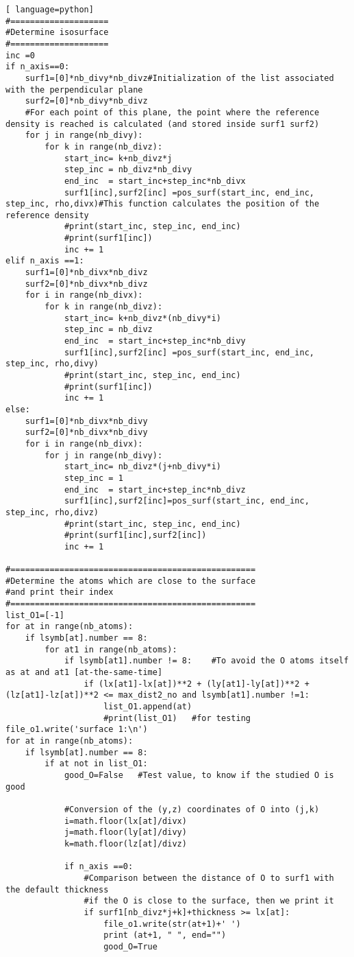 \begin{lstlisting}[ language=python]
#====================
#Determine isosurface
#====================
inc =0
if n_axis==0:
	surf1=[0]*nb_divy*nb_divz#Initialization of the list associated with the perpendicular plane
	surf2=[0]*nb_divy*nb_divz
	#For each point of this plane, the point where the reference density is reached is calculated (and stored inside surf1 surf2)
	for j in range(nb_divy):
		for k in range(nb_divz):
			start_inc= k+nb_divz*j
			step_inc = nb_divz*nb_divy
			end_inc  = start_inc+step_inc*nb_divx
			surf1[inc],surf2[inc] =pos_surf(start_inc, end_inc, step_inc, rho,divx)#This function calculates the position of the reference density
			#print(start_inc, step_inc, end_inc)
			#print(surf1[inc])
			inc += 1
elif n_axis ==1:
	surf1=[0]*nb_divx*nb_divz
	surf2=[0]*nb_divx*nb_divz
	for i in range(nb_divx):
		for k in range(nb_divz):
			start_inc= k+nb_divz*(nb_divy*i)
			step_inc = nb_divz
			end_inc  = start_inc+step_inc*nb_divy
			surf1[inc],surf2[inc] =pos_surf(start_inc, end_inc, step_inc, rho,divy)
			#print(start_inc, step_inc, end_inc)
			#print(surf1[inc])
			inc += 1
else:
	surf1=[0]*nb_divx*nb_divy
	surf2=[0]*nb_divx*nb_divy
	for i in range(nb_divx):
		for j in range(nb_divy):
			start_inc= nb_divz*(j+nb_divy*i)
			step_inc = 1
			end_inc  = start_inc+step_inc*nb_divz
			surf1[inc],surf2[inc]=pos_surf(start_inc, end_inc, step_inc, rho,divz)
			#print(start_inc, step_inc, end_inc)
			#print(surf1[inc],surf2[inc])
			inc += 1

#==================================================
#Determine the atoms which are close to the surface
#and print their index
#==================================================
list_O1=[-1]
for at in range(nb_atoms):
	if lsymb[at].number == 8:
		for at1 in range(nb_atoms): 
			if lsymb[at1].number != 8:    #To avoid the O atoms itself as at and at1 [at-the-same-time]  
				if (lx[at1]-lx[at])**2 + (ly[at1]-ly[at])**2 +(lz[at1]-lz[at])**2 <= max_dist2_no and lsymb[at1].number !=1:
					list_O1.append(at)
					#print(list_O1)   #for testing
file_o1.write('surface 1:\n')
for at in range(nb_atoms):
	if lsymb[at].number == 8:
		if at not in list_O1:
			good_O=False   #Test value, to know if the studied O is good 

			#Conversion of the (y,z) coordinates of O into (j,k)
			i=math.floor(lx[at]/divx)
			j=math.floor(ly[at]/divy)
			k=math.floor(lz[at]/divz)

			if n_axis ==0:
				#Comparison between the distance of O to surf1 with the default thickness
				#if the O is close to the surface, then we print it
				if surf1[nb_divz*j+k]+thickness >= lx[at]:
					file_o1.write(str(at+1)+' ')
					print (at+1, " ", end="")
					good_O=True


\end{lstlisting}
